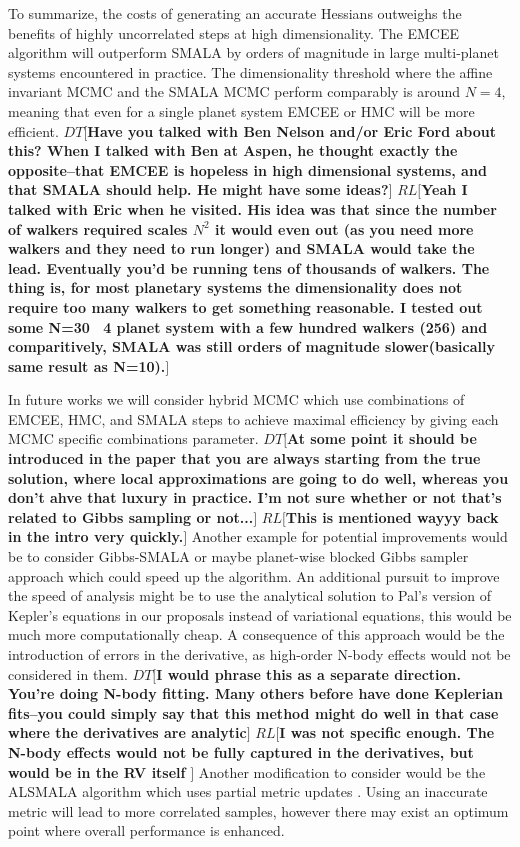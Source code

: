 \documentclass{aa}
\def\memodt#1{\color{green}$DT[${\bf #1}$]$ \color{black}}
\def\memorl#1{\color{gray}$RL[${\bf #1}$]$ \color{black}}
\begin{document}
To summarize, the costs of generating an accurate Hessians outweighs the benefits of highly uncorrelated steps at high dimensionality. 
The EMCEE algorithm will outperform SMALA by orders of magnitude in large multi-planet systems encountered in practice. 
The dimensionality threshold where the affine invariant MCMC and the SMALA MCMC perform comparably is around $N = 4$, meaning that even for a single planet system EMCEE or HMC will be more efficient.
\memodt{Have you talked with Ben Nelson and/or Eric Ford about this? When I talked with Ben at Aspen, he thought exactly the opposite--that EMCEE is hopeless in high dimensional systems, and that SMALA should help. He might have some ideas?}
\memorl{Yeah I talked with Eric when he visited. His idea was that since the number of walkers required scales $N^2$ it would even out (as you need more walkers and they need to run longer) and SMALA would take the lead.  Eventually you'd be running tens of thousands of walkers. The thing is, for most planetary systems the dimensionality does not require too many walkers to get something reasonable. I tested out some N=30~ 4 planet system with a few hundred walkers (256) and comparitively, SMALA was still orders of magnitude slower(basically same result as N=10).}

In future works we will consider hybrid MCMC which use combinations of  EMCEE, HMC, and SMALA steps to achieve maximal efficiency by giving each MCMC specific combinations parameter. 
\memodt{At some point it should be introduced in the paper that you are always starting from the true solution, where local approximations are going to do well, whereas you don't ahve that luxury in practice. I'm not sure whether or not that's related to Gibbs sampling or not...}
\memorl{This is mentioned wayyy back in the intro very quickly.}
Another example for potential improvements would be to consider Gibbs-SMALA or maybe planet-wise blocked Gibbs sampler approach which could speed up the algorithm. 
An additional pursuit to improve the speed of analysis might be to use the analytical solution to Pal's version of Kepler's equations in our proposals instead of variational equations, this would be much more computationally cheap. 
A consequence of this approach would be the introduction of errors in the derivative, as high-order N-body effects would not be considered in them. \memodt{I would phrase this as a separate direction. You're doing N-body fitting. Many others before have done Keplerian fits--you could simply say that this method might do well in that case where the derivatives are analytic}
\memorl{I was not specific enough. The N-body effects would not be fully captured in the derivatives, but would be in the RV itself }
Another modification to consider would be the ALSMALA algorithm which uses partial metric updates \cite{1608.07986}. 
Using an inaccurate metric will lead to more correlated samples, however there may exist an optimum point where overall performance is enhanced.
\end{document}
